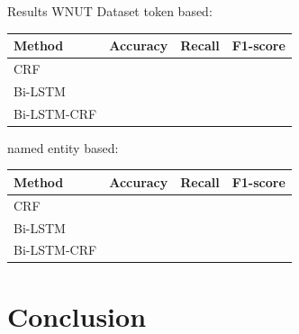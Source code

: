 \documentclass[12pt, tikz]{beamer}
\begin{document}
\begin{frame}[fragile]{Results WNUT Dataset}
	token based:
	\begin{center}
		\begin{tabular}{| l | c | c | c |}
			\hline
			Method & Accuracy & Recall & F1-score \\ \hline
			CRF &  &  &  \\ \hline
			Bi-LSTM &  &  &  \\ \hline
			Bi-LSTM-CRF &  &  &  \\ \hline
		\end{tabular}
	\end{center}
	
	named entity based:
	\begin{center}
		\begin{tabular}{| l | c | c | c |}
			\hline
			Method & Accuracy & Recall & F1-score \\ \hline
			CRF &  &  &  \\ \hline
			Bi-LSTM &  &  &  \\ \hline
			Bi-LSTM-CRF &  &  &  \\ \hline
		\end{tabular}
	\end{center}
\end{frame}


\section{Conclusion}


\end{document}

